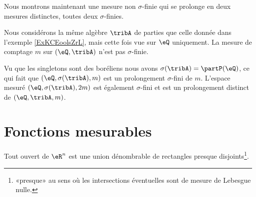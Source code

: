 
\begin{example}
    Nous montrons maintenant une mesure non \( \sigma\)-finie qui se prolonge en deux mesures distinctes, toutes deux \( \sigma\)-finies.

    Nous considérons la même algèbre \( \tribA\) de parties que celle donnée dans l'exemple \ref{ExKCEoolsZrL}, mais cette fois vue sur \( \eQ\) uniquement. La mesure de comptage \( m\) sur \( (\eQ,\tribA)\) n'est pas \( \sigma\)-finie.

    Vu que les singletons sont des boréliens nous avons \( \sigma(\tribA)=\partP(\eQ)\), ce qui fait que \( (\eQ,\sigma(\tribA),m)\) est un prolongement \( \sigma\)-fini de \( m\). L'espace mesuré \( (\eQ,\sigma(\tribA),2m)\) est également \( \sigma\)-fini et est un prolongement distinct de \( (\eQ,\tribA,m)\).
\end{example}

\section{Fonctions mesurables}

\begin{proposition}     \label{PropTHDQooWMSbJe}
    Tout ouvert de \( \eR^n\) est une union dénombrable de rectangles presque disjoints\footnote{«presque» au sens où les intersections éventuelles sont de mesure de Lebesgue nulle.}.
\end{proposition}

